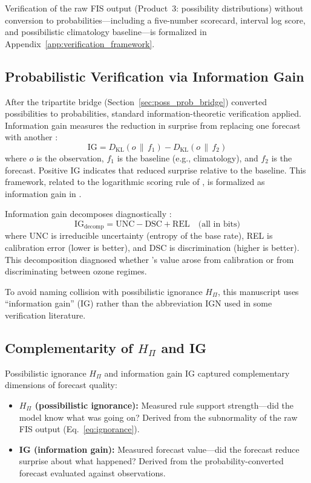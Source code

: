 Verification of the raw FIS output (Product~3: possibility distributions) without conversion to probabilities---including a five-number scorecard, interval log score, and possibilistic climatology baseline---is formalized in Appendix~\ref{app:verification_framework}.

\subsection{Probabilistic Verification via Information Gain}\label{sec:ig_verification}

After the tripartite bridge (Section~\ref{sec:poss_prob_bridge}) converted possibilities to probabilities, standard information-theoretic verification applied. Information gain measures the reduction in surprise from replacing one forecast with another \citep{Lawson2024-bu}:
\begin{equation}
\text{IG} = D_{\text{KL}}(o \,\|\, f_1) - D_{\text{KL}}(o \,\|\, f_2)
\label{eq:ig}
\end{equation}
where $o$ is the observation, $f_1$ is the baseline (e.g., climatology), and $f_2$ is the \clyfar{} forecast. Positive IG indicates that \clyfar{} reduced surprise relative to the baseline. This framework, related to the logarithmic scoring rule of \citet{Roulston2002-eq}, is formalized as information gain in \citet{Lawson2024-bu}.

Information gain decomposes diagnostically \citep[Eq.~14]{Lawson2024-bu}:
\begin{equation}
\text{IG}_{\text{decomp}} = \text{UNC} - \text{DSC} + \text{REL} \quad \text{(all in bits)}
\label{eq:ig_decomp}
\end{equation}
where UNC is irreducible uncertainty (entropy of the base rate), REL is calibration error (lower is better), and DSC is discrimination (higher is better). This decomposition diagnosed whether \clyfar{}'s value arose from calibration or from discriminating between ozone regimes.

To avoid naming collision with possibilistic ignorance $H_\Pi$, this manuscript uses ``information gain'' (IG) rather than the abbreviation IGN used in some verification literature.

\subsection{Complementarity of $H_\Pi$ and IG}\label{sec:complementarity}

Possibilistic ignorance $H_\Pi$ and information gain IG captured complementary dimensions of forecast quality:
\begin{itemize}[leftmargin=2em]
\item \textbf{$H_\Pi$ (possibilistic ignorance):} Measured rule support strength---did the model know what was going on? Derived from the subnormality of the raw FIS output (Eq.~\ref{eq:ignorance}).
\item \textbf{IG (information gain):} Measured forecast value---did the forecast reduce surprise about what happened? Derived from the probability-converted forecast evaluated against observations.
\end{itemize}

